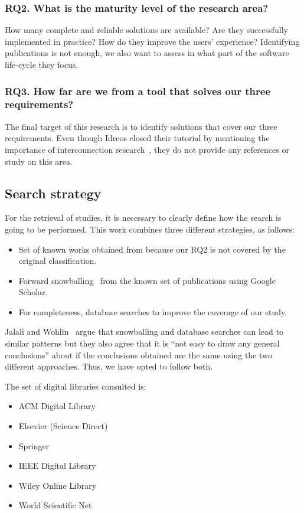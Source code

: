\subsubsection{RQ2. What is the maturity level of the research area?}
How many complete and reliable solutions are available?
Are they successfully implemented in practice?
How do they improve the users' experience? Identifying publications is not enough,
we also want to assess in what part of the software life-cycle they focus.

\subsubsection{RQ3. How far are we from a tool that solves our three requirements?}
The final target of this research is to identify solutions that cover our three
requirements.
Even though Idreos closed their tutorial by
mentioning the importance of interconnection research~\cite{Idreos2015}, they do not provide
any references or study on this area.

\subsection{Search strategy}
\label{sec:mapping/search_strategy}

For the retrieval of studies, it is necessary to clearly define
how the search is going to be performed. This work combines
three different strategies, as follows:

\begin{itemize}
  \item Set of known works obtained from \cite{Idreos2015} because our RQ2 is
    not covered by the original classification.
  \item Forward snowballing~\cite{Webster2002} from the known set of publications using Google Scholar.
  \item For completeness, database searches to improve the coverage of our study.
\end{itemize}

Jalali and Wohlin~\cite{Jalali2012} argue that snowballing and database searches
can lead to similar patterns but they also agree that it is
``not easy to draw any general conclusions'' about if the conclusions obtained are the same
using the two different approaches. Thus, we have opted to follow both.

The set of digital libraries consulted is:

\begin{itemize}
  \item ACM Digital Library
  \item Elsevier (Science Direct)
  \item Springer
  \item IEEE Digital Library
  \item Wiley Online Library
  \item World Scientific Net
\end{itemize}

